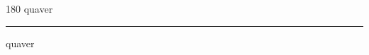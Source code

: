 
\begin{frame}
\begin{center}
\begin{turn}{180}
{\fontsize{2.5cm}{1em}\selectfont quaver}
\end{turn}
\vspace{1em}\par  
\hrule
\vspace{1em}\par  
{\fontsize{2.5cm}{1em}\selectfont quaver}
\end{center}
\end{frame}

